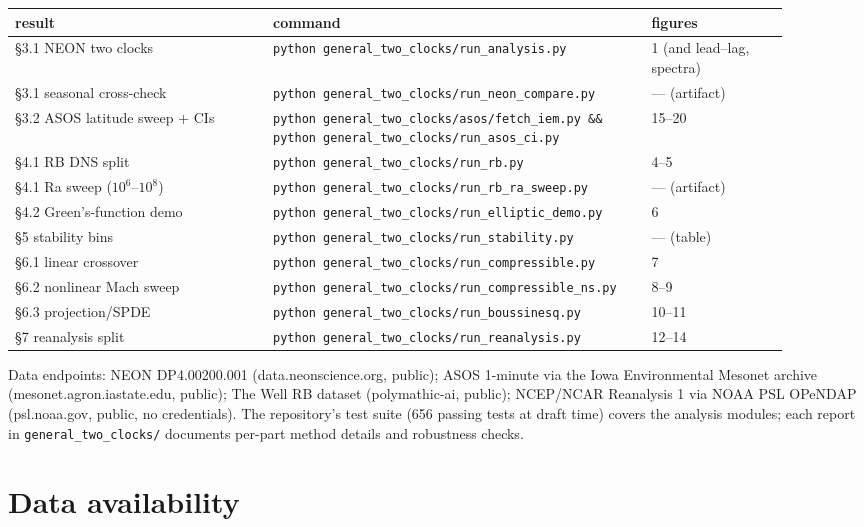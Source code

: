\documentclass[aps,prfluids,preprint,superscriptaddress,nofootinbib]{revtex4-2}
\newcommand{\code}[1]{\texttt{#1}}
\begin{document}
\begin{center}
\begin{tabular}{p{0.30\linewidth}p{0.44\linewidth}p{0.16\linewidth}}
\toprule
result & command & figures \\
\midrule
\S3.1 NEON two clocks & \code{python general\_two\_clocks/run\_analysis.py} & 1 (and lead--lag, spectra) \\
\S3.1 seasonal cross-check & \code{python general\_two\_clocks/run\_neon\_compare.py} & --- (artifact) \\
\S3.2 ASOS latitude sweep + CIs & \code{python general\_two\_clocks/asos/fetch\_iem.py \&\& python general\_two\_clocks/run\_asos\_ci.py} & 15--20 \\
\S4.1 RB DNS split & \code{python general\_two\_clocks/run\_rb.py} & 4--5 \\
\S4.1 Ra sweep ($10^{6}$--$10^{8}$) & \code{python general\_two\_clocks/run\_rb\_ra\_sweep.py} & --- (artifact) \\
\S4.2 Green's-function demo & \code{python general\_two\_clocks/run\_elliptic\_demo.py} & 6 \\
\S5 stability bins & \code{python general\_two\_clocks/run\_stability.py} & --- (table) \\
\S6.1 linear crossover & \code{python general\_two\_clocks/run\_compressible.py} & 7 \\
\S6.2 nonlinear Mach sweep & \code{python general\_two\_clocks/run\_compressible\_ns.py} & 8--9 \\
\S6.3 projection/SPDE & \code{python general\_two\_clocks/run\_boussinesq.py} & 10--11 \\
\S7 reanalysis split & \code{python general\_two\_clocks/run\_reanalysis.py} & 12--14 \\
\bottomrule
\end{tabular}
\end{center}

Data endpoints: NEON DP4.00200.001 (data.neonscience.org, public); ASOS 1-minute via the Iowa Environmental Mesonet archive (mesonet.agron.iastate.edu, public); The Well RB dataset (polymathic-ai, public); NCEP/NCAR Reanalysis 1 via NOAA PSL OPeNDAP (psl.noaa.gov, public, no credentials). The repository's test suite (656 passing tests at draft time) covers the analysis modules; each report in \code{general\_two\_clocks/} documents per-part method details and robustness checks.

\section*{Data availability}
\end{document}
